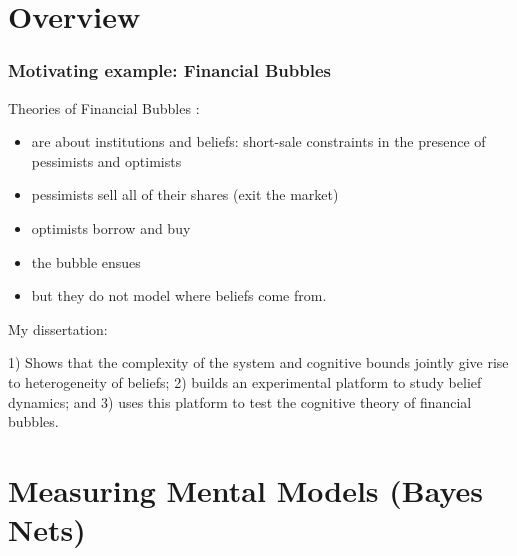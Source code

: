 \documentclass{beamer}
\begin{document}
\section{Overview}
\begin{frame}
\frametitle{Motivating example: Financial Bubbles}
 
Theories of Financial Bubbles \citep[optimists and pessimists, e.g][]{Scheinkman2003}: 

\begin{itemize}
\item are about institutions and beliefs: short-sale constraints in the presence of pessimists and optimists\\
\item pessimists sell all of their shares (exit the market)
\item optimists borrow and buy
\item the bubble ensues      
\item but they do not model where beliefs come from. \\
\end{itemize}

\vspace{0.5cm}

\begin{center}
My dissertation:\\
\end{center}
1) Shows that the complexity of the system and cognitive bounds jointly give rise to heterogeneity of beliefs; 2) builds an experimental platform to study belief dynamics; and 3) uses this platform to test the cognitive theory of financial bubbles.\\


\end{frame}

\section{Measuring Mental Models (Bayes Nets)}
\end{document}

